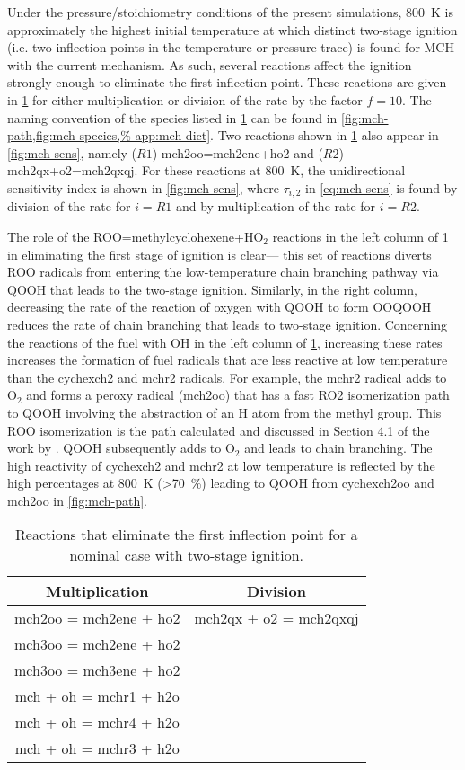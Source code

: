 \documentclass[../main.tex]{subfiles}
\begin{document}
Under the pressure/stoichiometry conditions of the present simulations, \SI{800}{\kelvin}
is approximately the highest initial temperature at which distinct two-stage
ignition (i.e. two inflection points in the temperature or pressure trace) is
found for MCH with the current mechanism. As such, several reactions affect
the ignition strongly enough to eliminate the first inflection point. These
reactions are given in \cref{tab:mch-sens} for either multiplication or
division of the rate by the factor $f=10$. The naming convention of the species
listed in \cref{tab:mch-sens} can be found in \cref{fig:mch-path,fig:mch-species,%
app:mch-dict}. Two reactions shown in
\cref{tab:mch-sens} also appear in \cref{fig:mch-sens}, namely ($R1$)
mch2oo=mch2ene+ho2 and ($R2$) mch2qx+o2=mch2qxqj. For these reactions at \SI{800}{\kelvin},
the unidirectional sensitivity index is shown in \cref{fig:mch-sens}, where $\tau_{i,2}$
in \cref{eq:mch-sens} is found by division of the rate for $i=R1$ and by
multiplication of the rate for $i=R2$.

The role of the ROO=methylcyclohexene+HO$_2$ reactions in the left column of
\cref{tab:mch-sens} in eliminating the first stage of ignition is clear---%
this set of reactions diverts ROO radicals from entering the low-temperature
chain branching pathway via QOOH that leads to the two-stage ignition.
Similarly, in the right column, decreasing the rate of the reaction of oxygen
with QOOH to form OOQOOH reduces the rate of chain branching that leads to
two-stage ignition. Concerning the reactions of the fuel with OH in the left
column of \cref{tab:mch-sens}, increasing these rates increases the
formation of fuel radicals that are less reactive at low temperature than the
cychexch2 and mchr2 radicals. For example, the mchr2 radical adds to O$_2$ and
forms a peroxy radical (mch2oo) that has a fast RO2 isomerization path to QOOH
involving the abstraction of an H atom from the methyl group. This ROO
isomerization is the path calculated and discussed in Section 4.1 of the work by
\textcite{Weber2014}. QOOH subsequently adds to O$_2$ and leads to chain branching.
The high reactivity of cychexch2 and mchr2 at low temperature is reflected by
the high percentages at \SI{800}{\kelvin} (>\SI{70}{\percent}) leading to QOOH from cychexch2oo and
mch2oo in \cref{fig:mch-path}.

\begin{table}
    \caption{Reactions that eliminate the first inflection point for a nominal
    case with two-stage ignition.}
    \label{tab:mch-sens}
    \begin{tabular}{c c}
    \toprule
    Multiplication & Division \\
    \midrule
    mch2oo = mch2ene + ho2 & mch2qx + o2 = mch2qxqj \\
    mch3oo = mch2ene + ho2 & \\
    mch3oo = mch3ene + ho2 & \\
    mch + oh = mchr1 + h2o & \\
    mch + oh = mchr4 + h2o & \\
    mch + oh = mchr3 + h2o & \\
    \bottomrule
    \end{tabular}
\end{table}
\end{document}
